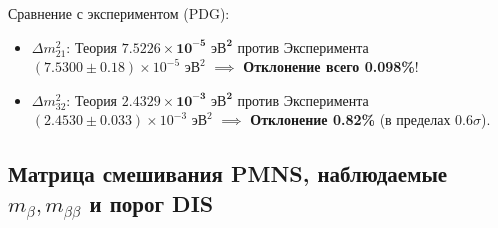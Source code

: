 \documentclass[12pt,a4paper]{article}
\begin{document}
	Сравнение с экспериментом (PDG):
	\begin{itemize}
		\item $\Delta m_{21}^2$: Теория $\mathbf{7.5226 \times 10^{-5} \text{ эВ}^2}$ против Эксперимента $(7.5300 \pm 0.18) \times 10^{-5} \text{ эВ}^2$ $\implies$ \textbf{Отклонение всего 0.098\%}!
		\item $\Delta m_{32}^2$: Теория $\mathbf{2.4329 \times 10^{-3} \text{ эВ}^2}$ против Эксперимента $(2.4530 \pm 0.033) \times 10^{-3} \text{ эВ}^2$ $\implies$ \textbf{Отклонение 0.82\%} (в пределах $0.6\sigma$).
	\end{itemize}
	
	\subsection{Матрица смешивания PMNS, наблюдаемые $m_\beta, m_{\beta\beta}$ и порог DIS}
\end{document}
